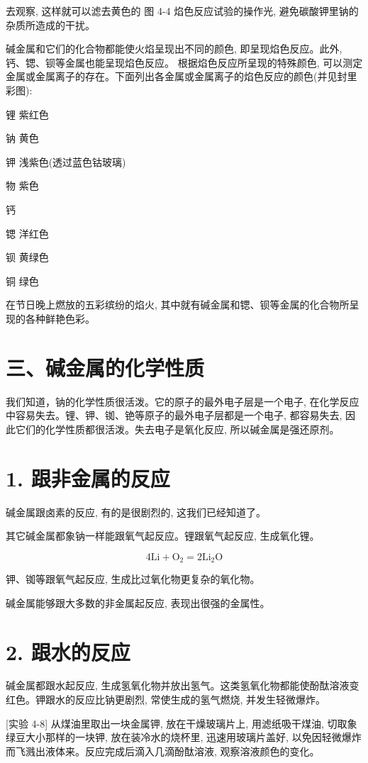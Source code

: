 \documentclass[10pt]{article}
\begin{document}
去观察, 这样就可以滤去黄色的 图 4-4 焰色反应试验的操作光, 避免碳酸钾里钠的杂质所造成的干扰。

碱金属和它们的化合物都能使火焰呈现出不同的颜色, 即呈现焰色反应。此外, 钙、锶、钡等金属也能呈现焰色反应。 根据焰色反应所呈现的特殊颜色, 可以测定金属或金属离子的存在。下面列出各金属或金属离子的焰色反应的颜色(并见封里彩图):

锂 紫红色

钠 黄色

钾 浅紫色(透过蓝色钴玻璃)

物 紫色

钙

锶 洋红色

钡 黄绿色

铜 绿色

在节日晚上燃放的五彩缤纷的焰火, 其中就有碱金属和锶、钡等金属的化合物所呈现的各种鲜艳色彩。

\section*{三、碱金属的化学性质}

我们知道，钠的化学性质很活泼。它的原子的最外电子层是一个电子, 在化学反应中容易失去。锂、钾、铷、铯等原子的最外电子层都是一个电子, 都容易失去, 因此它们的化学性质都很活泼。失去电子是氧化反应, 所以碱金属是强还原剂。

\section*{1. 跟非金属的反应}

碱金属跟卤素的反应, 有的是很剧烈的, 这我们已经知道了。

其它碱金属都象钠一样能跟氧气起反应。锂跟氧气起反应, 生成氧化锂。

\[
4\mathrm{{Li}} + {\mathrm{O}}_{2} = 2{\mathrm{{Li}}}_{2}\mathrm{O}
\]

钾、铷等跟氧气起反应, 生成比过氧化物更复杂的氧化物。

碱金属能够跟大多数的非金属起反应, 表现出很强的金属性。

\section*{2. 跟水的反应}

碱金属都跟水起反应, 生成氢氧化物并放出氢气。这类氢氧化物都能使酚酞溶液变红色。钾跟水的反应比钠更剧烈, 常使生成的氢气燃烧, 并发生轻微爆炸。

[实验 4-8] 从煤油里取出一块金属钾, 放在干燥玻璃片上, 用滤纸吸干煤油, 切取象绿豆大小那样的一块钾, 放在装冷水的烧杯里, 迅速用玻璃片盖好, 以免因轻微爆炸而飞溅出液体来。反应完成后滴入几滴酚酞溶液, 观察溶液颜色的变化。
\end{document}
